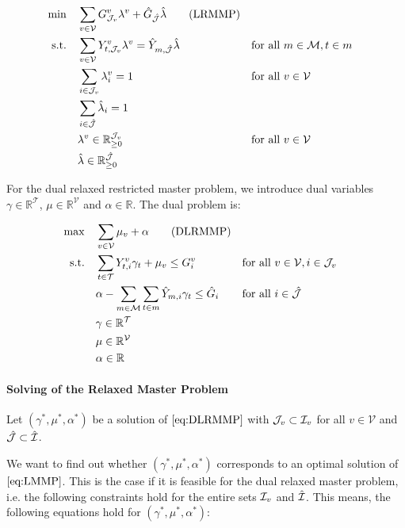\begin{align*}
	\min \quad & \sum_{v\in\mathcal{V}}G^v_{\mathcal{J}_v}\lambda^v + \hat{G}_{\hat{\mathcal{J}}}\hat{\lambda} \tag{LRMMP} \\
	\text{s.t.} \quad & \sum_{v\in\mathcal{V}} Y^v_{t,\mathcal{J}_v}\lambda^v = \hat{Y}_{m,\hat{\mathcal{J}}}\hat{\lambda} && \text{for all } m\in\mathcal{M},t\in m \\
	& \sum_{i\in\mathcal{J}_v}\lambda_i^v=1 && \text{for all } v\in\mathcal{V}\\
	& \sum_{i\in\hat{\mathcal{J}}}\hat{\lambda}_i= 1 \\
	& \lambda^v\in\mathbb{R}_{\geq 0}^{\mathcal{J}_v} && \text{for all } v\in\mathcal{V} \\
	& \hat{\lambda}\in\mathbb{R}_{\geq 0}^{\hat{\mathcal{J}}}
\end{align*}

For the dual relaxed restricted master problem, we introduce dual variables $\gamma\in\mathbb{R}^{\mathcal{T}}$, $\mu\in\mathbb{R}^{\mathcal{V}}$ and $\alpha\in\mathbb{R}$. The dual problem is:

\begin{align*}
	\max \quad & \sum_{v\in\mathcal{V}}\mu_v + \alpha \tag{DLRMMP} \label{eq:DLRMMP} \\
	\text{s.t.} \quad & \sum_{t\in\mathcal{T}} Y^v_{t,i}\gamma_t + \mu_v \leq G^v_i && \text{for all } v\in\mathcal{V},i\in\mathcal{J}_v \\
	& \alpha - \sum_{m\in\mathcal{M}}\sum_{t\in m}\hat{Y}_{m,i}\gamma_t \leq \hat{G}_i && \text{for all } i\in\hat{\mathcal{J}} \\
	& \gamma\in\mathbb{R}^{\mathcal{T}} \\
	& \mu\in\mathbb{R}^{\mathcal{V}} \\
	& \alpha\in\mathbb{R}
\end{align*}

\paragraph{Solving of the Relaxed Master Problem} \parfill

Let $\left(\gamma^*,\mu^*,\alpha^*\right)$ be a solution of $\eqref{eq:DLRMMP}$ with $\mathcal{J}_v\subset\mathcal{I}_v$ for all $v\in\mathcal{V}$ and $\hat{\mathcal{J}}\subset\hat{\mathcal{I}}$. 

We want to find out whether $\left(\gamma^*,\mu^*,\alpha^*\right)$ corresponds to an optimal solution of $\eqref{eq:LMMP}$. This is the case if it is feasible for the dual relaxed master problem, i.e. the following constraints hold for the entire sets $\mathcal{I}_v$ and $\hat{\mathcal{I}}$. This means, the following equations hold for $\left(\gamma^*,\mu^*,\alpha^*\right)$:

